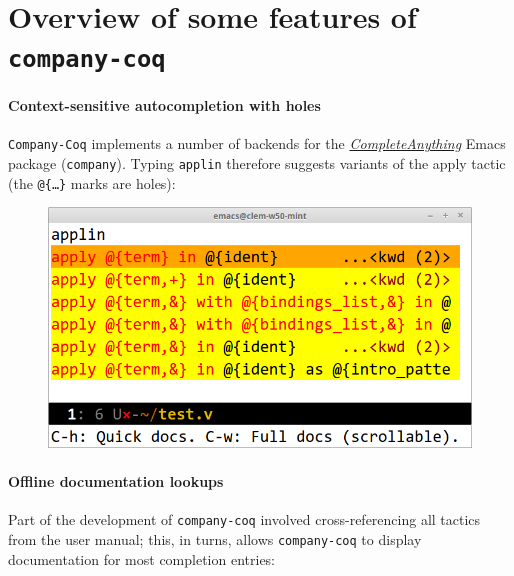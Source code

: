 \documentclass[preprint]{sigplanconf}
\begin{document}
\section*{Overview of some features of \texttt{company-coq}}

\paragraph{Context-sensitive autocompletion with holes} \texttt{Company-Coq} implements a number of backends for the \href{https://company-mode.github.io/}{\emph{CompleteAnything}} Emacs package (\texttt{company}). Typing \texttt{appl{\kern0.5pt}in} therefore suggests variants of the apply tactic (the \texttt{@\{\ldots\}} marks are holes):

\begin{figure}[H]
  \centering
  \includegraphics[width=\linewidth]{apply-in-xxl.png}
\end{figure}

\paragraph{Offline documentation lookups} Part of the development of \texttt{company-coq} involved cross-referencing all tactics from the user manual; this, in turns, allows \texttt{company-coq} to display documentation for most completion entries:
\end{document}
